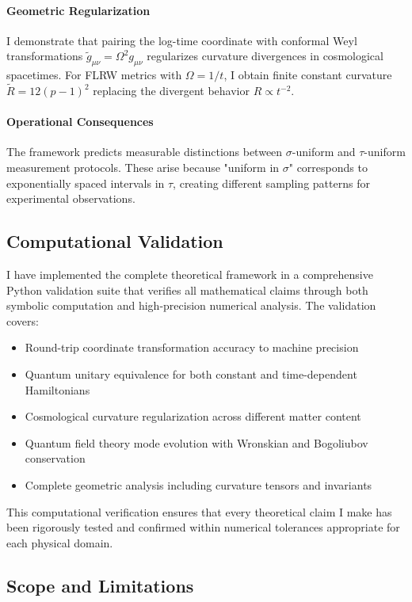\paragraph{Geometric Regularization} I demonstrate that pairing the log-time coordinate with conformal Weyl transformations $\tilde{g}_{\mu\nu} = \Omega^2 g_{\mu\nu}$ regularizes curvature divergences in cosmological spacetimes. For FLRW metrics with $\Omega = 1/t$, I obtain finite constant curvature $\tilde{R} = 12(p-1)^2$ replacing the divergent behavior $R \propto t^{-2}$.

\paragraph{Operational Consequences} The framework predicts measurable distinctions between $\sigma$-uniform and $\tau$-uniform measurement protocols. These arise because "uniform in $\sigma$" corresponds to exponentially spaced intervals in $\tau$, creating different sampling patterns for experimental observations.

\subsection{Computational Validation}

I have implemented the complete theoretical framework in a comprehensive Python validation suite that verifies all mathematical claims through both symbolic computation and high-precision numerical analysis. The validation covers:
\begin{itemize}
\item Round-trip coordinate transformation accuracy to machine precision
\item Quantum unitary equivalence for both constant and time-dependent Hamiltonians
\item Cosmological curvature regularization across different matter content
\item Quantum field theory mode evolution with Wronskian and Bogoliubov conservation
\item Complete geometric analysis including curvature tensors and invariants
\end{itemize}

This computational verification ensures that every theoretical claim I make has been rigorously tested and confirmed within numerical tolerances appropriate for each physical domain.

\subsection{Scope and Limitations}

